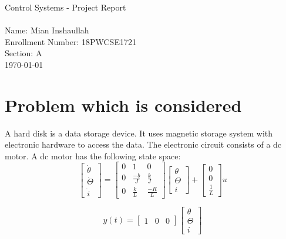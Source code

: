 \documentclass{article}
\begin{document}
\begin{flushleft}
{\sc \Large Control Systems - Project Report} \hfill \\ $ $ \\
\medskip
Name: Mian Inshaullah  \\
Enrollment Number: 18PWCSE1721\\
Section: A \\
\today
\end{flushleft}


\section{Problem which is considered}
\noindent A hard disk is a data storage device. It uses magnetic storage system with electronic hardware to access the data. The electronic circuit consists of a dc motor. A dc motor has the following state space:\\
\begin{equation}
\begin{bmatrix} \dot{\theta}\\  \dot{\Theta} \\ \dot{i}\end{bmatrix}
= \begin{bmatrix}
0 & 1 & 0 \\
0 & \frac{-b}{J} & \frac{k}{J} \\
0 & \frac{k}{L} & \frac{-R}{L}  \end{bmatrix}
\begin{bmatrix} \theta\\  \Theta \\ i \end{bmatrix} +
\begin{bmatrix}
0 \\
0 \\
\frac{1}{L}  \end{bmatrix}
 u 
\end{equation}\vskip10pt

\begin{equation}
y(t)=\begin{bmatrix}
1 & 0 & 0
\end{bmatrix}
\begin{bmatrix} \theta \\  \Theta \\ i \end{bmatrix}
\end{equation}
\end{document}
